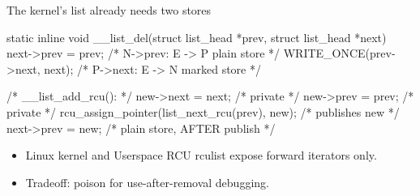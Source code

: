 \documentclass[aspectratio=169, 10pt, t, xcolor=table]{beamer}
\begin{document}
\begin{frame}[fragile]{The kernel's list already needs two stores}
\begin{codeblocksmall}
static inline void __list_del(struct list_head *prev,
                              struct list_head *next)
{
    next->prev = prev;              /* N->prev: E -> P   plain store  */
    WRITE_ONCE(prev->next, next);   /* P->next: E -> N   marked store */
}

/* __list_add_rcu(): */
new->next = next;                              /* private */
new->prev = prev;                              /* private */
rcu_assign_pointer(list_next_rcu(prev), new);  /* publishes new */
next->prev = new;                              /* plain store, AFTER publish */
\end{codeblocksmall}
\vspace{2mm}
\begin{itemize}
\item Linux kernel and Userspace RCU rculist expose forward iterators only.
\item Tradeoff: poison  for use-after-removal debugging.
\end{itemize}
\end{frame}
\end{document}
